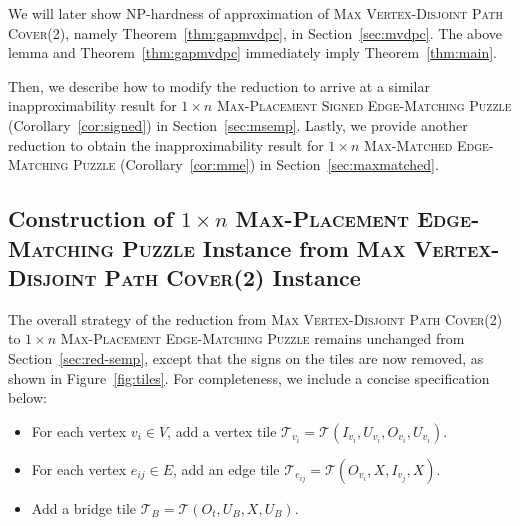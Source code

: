 \documentclass[11pt]{article}
\begin{document}
We will later show NP-hardness of approximation of \textsc{Max Vertex-Disjoint Path Cover(2)}, namely Theorem~\ref{thm:gapmvdpc}, in Section~\ref{sec:mvdpc}. The above lemma and Theorem~\ref{thm:gapmvdpc} immediately imply Theorem~\ref{thm:main}.

Then, we describe how to modify the reduction to arrive at a similar inapproximability result for \textsc{$1 \times n$ Max-Placement Signed Edge-Matching Puzzle} (Corollary~\ref{cor:signed}) in Section~\ref{sec:msemp}.
Lastly, we provide another reduction to obtain the inapproximability result for \textsc{$1 \times n$ Max-Matched Edge-Matching Puzzle} (Corollary~\ref{cor:mme}) in Section~\ref{sec:maxmatched}.

\subsection{Construction of \textsc{$1 \times n$ Max-Placement Edge-Matching Puzzle} Instance from \textsc{Max Vertex-Disjoint Path Cover(2)} Instance} \label{sec:red-memp}

The overall strategy of the reduction from \textsc{Max Vertex-Disjoint Path Cover(2)} to \textsc{$1 \times n$ Max-Placement Edge-Matching Puzzle} remains unchanged from Section~\ref{sec:red-semp}, except that the signs on the tiles are now removed, as shown in Figure~\ref{fig:tiles}. For completeness, we include a concise specification below:
\begin{itemize}
	\item For each vertex $v_i \in V$, add a vertex tile $\mathcal{T}_{v_i} = \mathcal{T}(I_{v_i}, U_{v_i}, O_{v_i}, U_{v_i})$.
	\item For each vertex $e_{ij} \in E$, add an edge tile $\mathcal{T}_{e_{ij}} = \mathcal{T}(O_{v_i}, X, I_{v_j}, X)$.
	\item Add a bridge tile $\mathcal{T}_B = \mathcal{T}(O_t, U_B, X, U_B)$.
\end{itemize}
\end{document}

